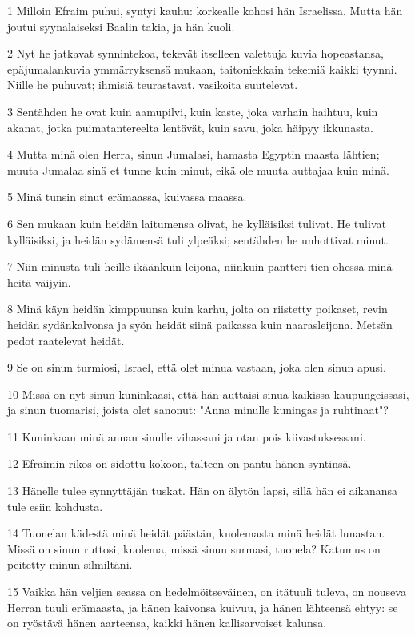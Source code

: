 \par 1 Milloin Efraim puhui, syntyi kauhu: korkealle kohosi hän Israelissa. Mutta hän joutui syynalaiseksi Baalin takia, ja hän kuoli.
\par 2 Nyt he jatkavat synnintekoa, tekevät itselleen valettuja kuvia hopeastansa, epäjumalankuvia ymmärryksensä mukaan, taitoniekkain tekemiä kaikki tyynni. Niille he puhuvat; ihmisiä teurastavat, vasikoita suutelevat.
\par 3 Sentähden he ovat kuin aamupilvi, kuin kaste, joka varhain haihtuu, kuin akanat, jotka puimatantereelta lentävät, kuin savu, joka häipyy ikkunasta.
\par 4 Mutta minä olen Herra, sinun Jumalasi, hamasta Egyptin maasta lähtien; muuta Jumalaa sinä et tunne kuin minut, eikä ole muuta auttajaa kuin minä.
\par 5 Minä tunsin sinut erämaassa, kuivassa maassa.
\par 6 Sen mukaan kuin heidän laitumensa olivat, he kylläisiksi tulivat. He tulivat kylläisiksi, ja heidän sydämensä tuli ylpeäksi; sentähden he unhottivat minut.
\par 7 Niin minusta tuli heille ikäänkuin leijona, niinkuin pantteri tien ohessa minä heitä väijyin.
\par 8 Minä käyn heidän kimppuunsa kuin karhu, jolta on riistetty poikaset, revin heidän sydänkalvonsa ja syön heidät siinä paikassa kuin naarasleijona. Metsän pedot raatelevat heidät.
\par 9 Se on sinun turmiosi, Israel, että olet minua vastaan, joka olen sinun apusi.
\par 10 Missä on nyt sinun kuninkaasi, että hän auttaisi sinua kaikissa kaupungeissasi, ja sinun tuomarisi, joista olet sanonut: "Anna minulle kuningas ja ruhtinaat"?
\par 11 Kuninkaan minä annan sinulle vihassani ja otan pois kiivastuksessani.
\par 12 Efraimin rikos on sidottu kokoon, talteen on pantu hänen syntinsä.
\par 13 Hänelle tulee synnyttäjän tuskat. Hän on älytön lapsi, sillä hän ei aikanansa tule esiin kohdusta.
\par 14 Tuonelan kädestä minä heidät päästän, kuolemasta minä heidät lunastan. Missä on sinun ruttosi, kuolema, missä sinun surmasi, tuonela? Katumus on peitetty minun silmiltäni.
\par 15 Vaikka hän veljien seassa on hedelmöitseväinen, on itätuuli tuleva, on nouseva Herran tuuli erämaasta, ja hänen kaivonsa kuivuu, ja hänen lähteensä ehtyy: se on ryöstävä hänen aarteensa, kaikki hänen kallisarvoiset kalunsa.

